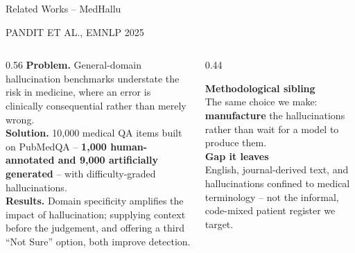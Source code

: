 \documentclass[aspectratio=169,11pt]{beamer}
\newcommand{\eyebrow}[1]{{\scriptsize\color{soft}\MakeUppercase{#1}}\\[1mm]}
\begin{document}
\begin{frame}{Related Works \;--\; MedHallu}
\vspace{-1mm}
{\small
\eyebrow{Pandit et al., EMNLP 2025}
\begin{columns}[T]
\begin{column}{0.56\textwidth}\footnotesize
\textbf{Problem.} General-domain hallucination benchmarks understate the risk in medicine, where an error is clinically consequential rather than merely wrong.\\[1.5mm]
\textbf{Solution.} 10,000 medical QA items built on PubMedQA -- \textbf{1,000 human-annotated and 9,000 artificially generated} -- with difficulty-graded hallucinations.\\[1.5mm]
\textbf{Results.} Domain specificity amplifies the impact of hallucination; supplying context before the judgement, and offering a third ``Not Sure'' option, both improve detection.
\end{column}
\begin{column}{0.44\textwidth}\footnotesize
\colorbox{panel}{\begin{minipage}{\textwidth}\vspace{1mm}
\textbf{Methodological sibling}\\[1.5mm]
The same choice we make: \textbf{manufacture} the hallucinations rather than wait for a model to produce them.\\[2mm]
\textbf{Gap it leaves}\\[1mm]
English, journal-derived text, and hallucinations confined to medical terminology -- not the informal, code-mixed patient register we target.
\vspace{1mm}\end{minipage}}
\end{column}
\end{columns}
}
\end{frame}
\end{document}
